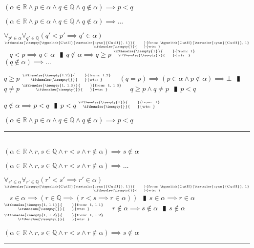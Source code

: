 \documentclass{book}
\newcommand{\wff}[1]{\hypertarget{#1}{\fbox{\textcolor{red}{#1}}\phantom{--}}}
\newcommand{\rf}[1]{\hyperlink{#1}{\textcolor{cyan}{#1}}}
\newcommand{\pipe}{$\phantom{(}\vrectangleblack\phantom{)}$}
\newcommand{\pr}[1]{\left(#1\right)}
\newcommand{\ann}[2]{%
  \hfill %
  $\stackrel%
  {\hbox{\tiny{\ifthenelse{\isempty{#1}}%
    {\phantom{from}}%
    {from: #1}}}}%
  {\hbox{\tiny{\ifthenelse{\isempty{#2}}%
    {\phantom{wts}}%
    {wts: #2}}}}$%
\ }
\begin{document}
\wff{CutCorollaryI} $(\alpha \in \mathbb{R} \land p \in \alpha \land q \in \mathbb{Q} \land q \notin \alpha) \implies p < q$
\begin{enumerate}
  \lit $(\alpha \in \mathbb{R} \land p \in \alpha \land q \in \mathbb{Q} \land q \notin \alpha) \implies \ldots$
  \begin{enumerate}
    \lit $\forall_{p' \in \alpha} \forall_{q' \in \mathbb{Q}}(q' < p' \implies q' \in \alpha)$    \ann{\rf{CutII}, 1}{}
    \lit $q < p \implies q \in \alpha$ \pipe $q \notin \alpha \implies q \geq p$    \ann{1}{}
    \lit $(q \notin \alpha) \implies \ldots$
    \begin{enumerate}
      \lit $q \geq p$    \ann{1.2}{}
      \lit $(q = p) \implies (p \in \alpha \land p \notin \alpha) \implies \bot$ \pipe $q \neq p$    \ann{1, 1.3}{}
      \lit $q \geq p \land q \neq p$ \pipe $p < q$
    \end{enumerate}
    \lit $q \notin \alpha \implies p < q$ \pipe $p < q$    \ann{1}{}
  \end{enumerate}
  \lit $(\alpha \in \mathbb{R} \land p \in \alpha \land q \in \mathbb{Q} \land q \notin \alpha) \implies p < q$
\end{enumerate} \vspace{.75mm} \hrule \vspace{.75mm} \ \\

\wff{CutCorollaryII} $(\alpha \in \mathbb{R} \land r, s \in \mathbb{Q} \land r < s \land r \notin \alpha) \implies s \notin \alpha$
\begin{enumerate}
  \lit $(\alpha \in \mathbb{R} \land r, s \in \mathbb{Q} \land r < s \land r \notin \alpha) \implies \ldots$
  \begin{enumerate}
    \lit $\forall_{s' \in \alpha} \forall_{r' \in \mathbb{Q}}(r' < s' \implies r' \in \alpha)$    \ann{\rf{CutII}, 1}{}
    \lit $s \in \alpha \implies \pr{r \in \mathbb{Q} \implies \pr{r < s \implies r \in \alpha}}$ \pipe $s \in \alpha \implies r \in \alpha$    \ann{1, 1.1}{}
    \lit $r \notin \alpha \implies s \notin \alpha$ \pipe $s \notin \alpha$    \ann{1, 1.2}{}
  \end{enumerate}
  \lit $(\alpha \in \mathbb{R} \land r, s \in \mathbb{Q} \land r < s \land r \notin \alpha) \implies s \notin \alpha$
\end{enumerate} \vspace{.75mm} \hrule \vspace{.75mm} \ \\
\end{document}
